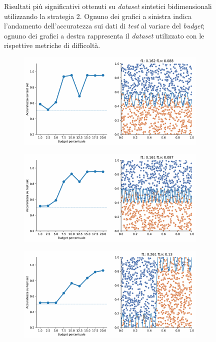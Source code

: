 \begin{figure}[b!]
\begin{subfigure}{\textwidth}
    \end{subfigure}
    \caption[Risultati su \emph{dataset} sintetici utilizzando la strategia 2.]{Risultati più significativi ottenuti su \emph{dataset} sintetici bidimensionali utilizzando la strategia 2. Ognuno dei grafici a sinistra indica l'andamento dell'accuratezza sui dati di \emph{test} al variare del \emph{budget}; ognuno dei grafici a destra rappresenta il \emph{dataset} utilizzato con le rispettive metriche di difficoltà.}
\end{figure}
\begin{figure}[ht]\ContinuedFloat
    \begin{subfigure}{\textwidth}
        \centering
        \includegraphics[width=.8\textwidth]{img/2d_v2/13.pdf}
    \end{subfigure}%
    \hfill
    \begin{subfigure}{\textwidth}
        \centering
        \includegraphics[width=.8\textwidth]{img/2d_v2/14.pdf}
    \end{subfigure}
    \hfill
    \begin{subfigure}{\textwidth}
        \centering
        \includegraphics[width=.8\textwidth]{img/2d_v2/15.pdf}

\end{subfigure}
\end{figure}
